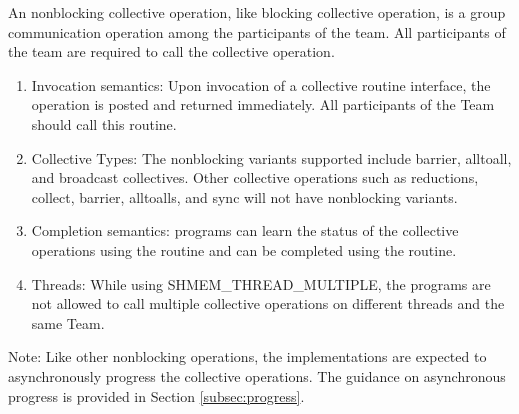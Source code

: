 An \openshmem nonblocking collective operation, like blocking collective
operation, is a group communication operation among the
participants of the team. All participants of the team are required to call the
collective operation.

\begin{enumerate}

\item Invocation semantics: Upon invocation of a collective routine interface,
the operation is posted and returned immediately. All participants of the Team
should call this routine.

\item Collective Types: The nonblocking variants supported include barrier, alltoall,
and broadcast collectives. Other collective operations such as
reductions, collect, barrier, alltoalls, and sync will not have nonblocking variants.

\item Completion semantics:  \openshmem programs can learn the status of the collective operations
using the  routine and can be completed using
the  routine.

\item Threads: While using SHMEM\_THREAD\_MULTIPLE, the \openshmem
programs are not allowed to call multiple collective operations on different threads
and the same Team.

\end{enumerate}

Note: Like other nonblocking \openshmem operations, the implementations are
expected to asynchronously progress the collective operations. The guidance on
asynchronous progress is provided in Section \ref{subsec:progress}.



